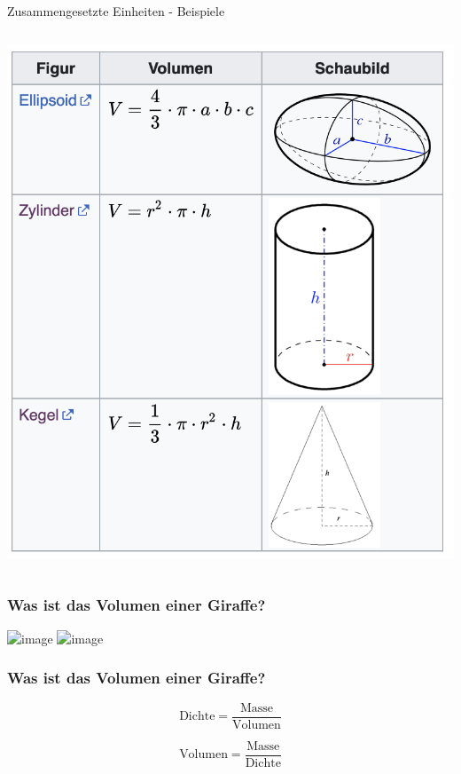 \documentclass{beamer}
\begin{document}
\begin{frame}{Zusammengesetzte Einheiten - Beispiele}
\begin{columns}[c]
\begin{column}{5cm}
\begin{center}
    \includegraphics[width=\textwidth]{Geometrische_Koerper.png}
\end{center}
    
\end{column}

    
\end{columns}



\end{frame}



\begin{frame}
\frametitle{Was ist das Volumen einer Giraffe?}

 
\begin{center}
\includegraphics<1>[width=0.6\textwidth]{giraffe_volumen_1.png}
\includegraphics<2>[width=0.6\textwidth]{giraffe_volumen_2.png}
\end{center}



\end{frame}


\begin{frame}
\frametitle{Was ist das Volumen einer Giraffe?}


\[ 
\text{Dichte}  = \frac{\text{Masse}}{\text{Volumen}}
\]

\[
\text{Volumen} =  \frac{\text{Masse}}{\text{Dichte}} 
\]


\end{frame}
\end{document}

